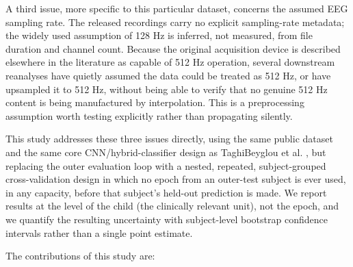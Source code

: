 \documentclass[a4paper,fleqn]{cas-sc}
\begin{document}
A third issue, more specific to this particular dataset, concerns the assumed EEG sampling rate. The released recordings carry no explicit sampling-rate metadata; the widely used assumption of 128 Hz is inferred, not measured, from file duration and channel count. Because the original acquisition device is described elsewhere in the literature as capable of 512 Hz operation, several downstream reanalyses have quietly assumed the data could be treated as 512 Hz, or have upsampled it to 512 Hz, without being able to verify that no genuine 512 Hz content is being manufactured by interpolation. This is a preprocessing assumption worth testing explicitly rather than propagating silently.



This study addresses these three issues directly, using the same public dataset and the same core CNN/hybrid-classifier design as TaghiBeyglou et al. \cite{taghibeyglou2022detection}, but replacing the outer evaluation loop with a nested, repeated, subject-grouped cross-validation design in which no epoch from an outer-test subject is ever used, in any capacity, before that subject's held-out prediction is made. We report results at the level of the child (the clinically relevant unit), not the epoch, and we quantify the resulting uncertainty with subject-level bootstrap confidence intervals rather than a single point estimate.



The contributions of this study are:
\end{document}
